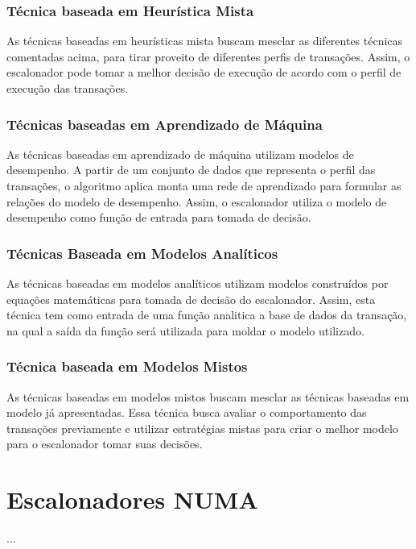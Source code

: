 \documentclass[ti]{texufpel} %
\begin{document}
\subsection{Técnica baseada em Heurística Mista}

As técnicas baseadas em heurísticas mista buscam mesclar as diferentes técnicas comentadas acima, para tirar proveito de diferentes perfis de transações. Assim, o escalonador pode tomar a melhor decisão de execução de acordo com o perfil de execução das transações.

\subsection{Técnicas baseadas em Aprendizado de Máquina}

As técnicas baseadas em aprendizado de máquina utilizam modelos de desempenho. A partir de um conjunto de dados que representa o perfil das transações, o algoritmo aplica monta uma rede de aprendizado para formular as relações do modelo de desempenho. Assim, o escalonador utiliza o modelo de desempenho como função de entrada para tomada de decisão.

\subsection{Técnicas Baseada em Modelos Analíticos}

As técnicas baseadas em modelos analíticos utilizam modelos construídos por equações matemáticas para tomada de decisão do escalonador. Assim, esta técnica tem como entrada de uma função analitica a base de dados da transação, na qual a saída da função será utilizada para moldar o modelo utilizado.

\subsection{Técnica baseada em Modelos Mistos}

As técnicas baseadas em modelos mistos buscam mesclar as técnicas baseadas em modelo já apresentadas. Essa técnica busca avaliar o comportamento das transações previamente e utilizar estratégias mistas para criar o melhor modelo para o escalonador tomar suas decisões.

\chapter{Escalonadores NUMA}

  ...
\end{document}
